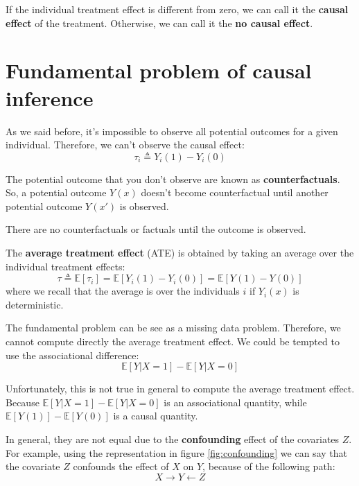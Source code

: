 \begin{note}
    If the individual treatment effect is different from zero, we can call it
    the \textbf{causal effect} of the treatment. Otherwise, we can call it the
    \textbf{no causal effect}.
\end{note}

\section{Fundamental problem of causal inference}
As we said before, it's impossible to observe all potential outcomes for a given
individual. Therefore, we can't observe the causal effect:
\begin{equation*}
    \tau_i \triangleq Y_i(1) - Y_i(0)
\end{equation*}

The potential outcome that you don't observe are known as \textbf{counterfactuals}.
So, a potential outcome $Y(x)$ doesn't become counterfactual until another
potential outcome $Y(x')$ is observed.

\begin{note}
    There are no counterfactuals or factuals until the outcome is observed.
\end{note}
\begin{definition}
    The \textbf{average treatment effect} (ATE) is obtained by taking an average
    over the individual treatment effects:
    \begin{equation}
        \tau \triangleq \mathbb{E}[\tau_i] = \mathbb{E}[Y_i(1) - Y_i(0)] = \mathbb{E}[Y(1) - Y(0)]
    \end{equation}
    where we recall that the average is over the individuals $i$ if $Y_i(x)$ is
    deterministic.
\end{definition}

The fundamental problem can be see as a missing data problem. Therefore, we cannot
compute directly the average treatment effect. We could be tempted to use the
associational difference:
\begin{equation}
    \mathbb{E}[Y|X = 1] - \mathbb{E}[Y|X = 0]
\end{equation}

Unfortunately, this is not true in general to compute the average treatment effect.
Because $\mathbb{E}[Y|X = 1] - \mathbb{E}[Y|X = 0]$ is an associational quantity,
while $\mathbb{E}[Y(1)] - \mathbb{E}[Y(0)]$ is a causal quantity.

In general, they are not equal due to the \textbf{confounding} effect of the covariates
$Z$. For example, using the representation in figure \ref{fig:confounding} we can
say that the covariate $Z$ confounds the effect of $X$ on $Y$, because of the
following path:
\begin{equation*}
    X \rightarrow Y \leftarrow Z
\end{equation*}

